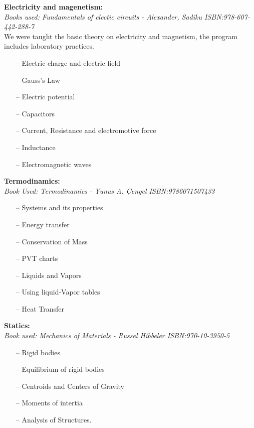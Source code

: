 \documentclass{article}
\begin{document}
\textbf{Electricity and magenetism:}\\
    \emph{Books used: Fundamentals of electic circuits - Alexander, Sadiku ISBN:978-607-442-288-7}\\
  We were taught the basic theory on electricity and magnetism, the program includes laboratory
  practices.
  \begin{itemize}
     \setlength\itemsep{0pt}
    \item[--] Electric charge and electric field
    \item[--] Gauss's Law
    \item[--] Electric potential
    \item[--] Capacitors
    \item[--] Current, Resistance and electromotive force
    \item[--] Inductance
    \item[--] Electromagnetic waves
  \end{itemize}


\textbf{Termodinamics:}\\
    \emph{Book Used: Termodinamics - Yunus A. \c{C}engel    ISBN:9786071507433}
    \begin{itemize}
     \setlength\itemsep{0pt}
        \item[--] Systems and its properties
        \item[--] Energy transfer
        \item[--] Conservation of Mass
        \item[--] PVT charts
        \item[--] Liquids and Vapors
        \item[--] Using liquid-Vapor tables
        \item[--] Heat Transfer
    \end{itemize}
\newpage

\textbf{Statics:}\\
    \emph{Book used: Mechanics of Materials - Russel Hibbeler ISBN:970-10-3950-5}
    \begin{itemize}
     \setlength\itemsep{0pt}
    \item[--] Rigid bodies
    \item[--] Equilibrium of rigid bodies
    \item[--] Centroids and Centers of Gravity
    \item[--] Moments of intertia
    \item[--] Analysis of Structures.
    \end{itemize}
 
\end{document}
